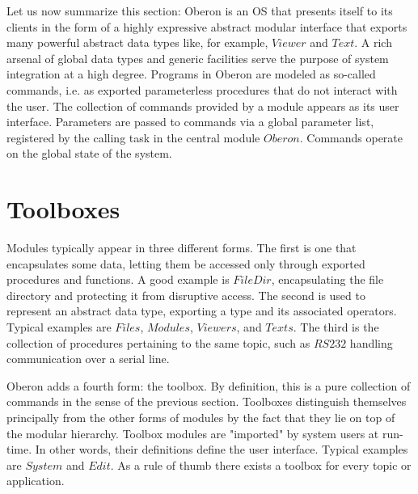 Let us now summarize this section: Oberon is an OS that presents itself to its
clients in the form of a highly expressive abstract modular interface that exports many powerful
abstract data types like, for example, $Viewer$ and $Text$. A rich arsenal of global data types and
generic facilities serve the purpose of system integration at a high degree. Programs in Oberon
are modeled as so-called commands, i.e. as exported parameterless procedures that do not
interact with the user. The collection of commands provided by a module appears as its user
interface. Parameters are passed to commands via a global parameter list, registered by the
calling task in the central module $Oberon$. Commands operate on the global state of the system.

\section{Toolboxes}
Modules typically appear in three different forms. The first is one that encapsulates some
data, letting them be accessed only through exported procedures and functions. A good example
is $FileDir$, encapsulating the file directory and protecting it from disruptive access. The
second is used to represent an abstract data type, exporting a type and its associated
operators. Typical examples are $Files$, $Modules$, $Viewers$, and $Texts$. The third is the
collection of procedures pertaining to the same topic, such as $RS232$ handling
communication over a serial line.

Oberon adds a fourth form: the toolbox. By definition, this is a pure collection of commands in the
sense of the previous section. Toolboxes distinguish themselves principally from the other forms
of modules by the fact that they lie on top of the modular hierarchy. Toolbox modules are
"imported" by system users at run-time. In other words, their definitions define the user interface.
Typical examples are $System$ and $Edit$. As a rule of thumb there exists a toolbox for
every topic or application.

